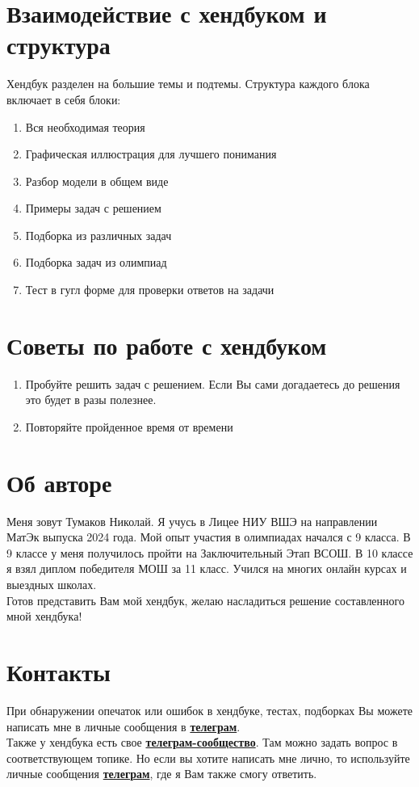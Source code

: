 \section{Взаимодействие с хендбуком и структура}
\indent\setlength{\parindent}{1em}Хендбук разделен на большие темы и подтемы. Структура каждого блока включает в себя блоки:
\begin{enumerate}
    \item Вся необходимая теория
    \item Графическая иллюстрация для лучшего понимания
    \item Разбор модели в общем виде
    \item Примеры задач с решением
    \item Подборка из различных задач
    \item Подборка задач из олимпиад
    \item Тест в гугл форме для проверки ответов на задачи
\end{enumerate}

\section{Советы по работе с хендбуком}
\begin{enumerate}
    \item Пробуйте решить задач с решением. Если Вы сами догадаетесь до решения это будет в разы полезнее.
    \item Повторяйте пройденное время от времени
\end{enumerate}

\section{Об авторе}
\indent\setlength{\parindent}{1em}Меня зовут Тумаков Николай. Я учусь в Лицее НИУ ВШЭ на направлении МатЭк выпуска 2024 года. Мой опыт участия в олимпиадах начался с 9 класса. В 9 классе у меня получилось пройти на Заключительный Этап ВСОШ. В 10 классе я взял диплом победителя МОШ за 11 класс. Учился на многих онлайн курсах и выездных школах.\smallskip\\
\indent\setlength{\parindent}{1em}Готов представить Вам мой хендбук, желаю насладиться решение составленного мной хендбука!

\section{Контакты}
\indent\setlength{\parindent}{1em}При обнаружении опечаток или ошибок в хендбуке, тестах, подборках Вы можете написать мне в личные сообщения в \textbf{\href{https://t.me/nntumakov}{телеграм}}.\smallskip\\
\indent\setlength{\parindent}{1em}Также у хендбука есть свое \textbf{\href{https://t.me/econ_handbook_screening}{телеграм-сообщество}}. Там можно задать вопрос в соответствующем топике. Но если вы хотите написать мне лично, то используйте личные сообщения \textbf{\href{https://t.me/nntumakov}{телеграм}}, где я Вам также смогу ответить.

